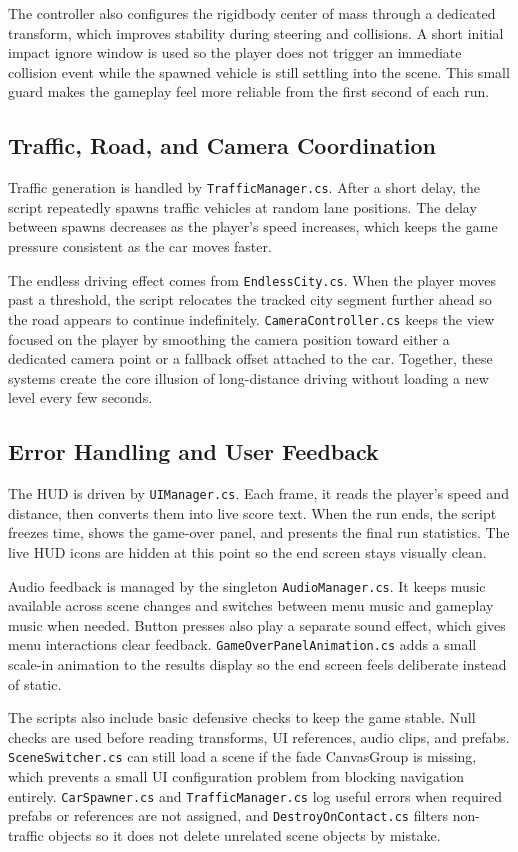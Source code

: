 \documentclass[12pt,a4paper]{article}
\begin{document}
The controller also configures the rigidbody center of mass through a dedicated transform, which improves stability during steering and collisions. A short initial impact ignore window is used so the player does not trigger an immediate collision event while the spawned vehicle is still settling into the scene. This small guard makes the gameplay feel more reliable from the first second of each run.

\subsection{Traffic, Road, and Camera Coordination}
Traffic generation is handled by \texttt{TrafficManager.cs}. After a short delay, the script repeatedly spawns traffic vehicles at random lane positions. The delay between spawns decreases as the player's speed increases, which keeps the game pressure consistent as the car moves faster.

The endless driving effect comes from \texttt{EndlessCity.cs}. When the player moves past a threshold, the script relocates the tracked city segment further ahead so the road appears to continue indefinitely. \texttt{CameraController.cs} keeps the view focused on the player by smoothing the camera position toward either a dedicated camera point or a fallback offset attached to the car. Together, these systems create the core illusion of long-distance driving without loading a new level every few seconds.

\subsection{Error Handling and User Feedback}
The HUD is driven by \texttt{UIManager.cs}. Each frame, it reads the player's speed and distance, then converts them into live score text. When the run ends, the script freezes time, shows the game-over panel, and presents the final run statistics. The live HUD icons are hidden at this point so the end screen stays visually clean.

Audio feedback is managed by the singleton \texttt{AudioManager.cs}. It keeps music available across scene changes and switches between menu music and gameplay music when needed. Button presses also play a separate sound effect, which gives menu interactions clear feedback. \texttt{GameOverPanelAnimation.cs} adds a small scale-in animation to the results display so the end screen feels deliberate instead of static.

The scripts also include basic defensive checks to keep the game stable. Null checks are used before reading transforms, UI references, audio clips, and prefabs. \texttt{SceneSwitcher.cs} can still load a scene if the fade CanvasGroup is missing, which prevents a small UI configuration problem from blocking navigation entirely. \texttt{CarSpawner.cs} and \texttt{TrafficManager.cs} log useful errors when required prefabs or references are not assigned, and \texttt{DestroyOnContact.cs} filters non-traffic objects so it does not delete unrelated scene objects by mistake.
\end{document}
